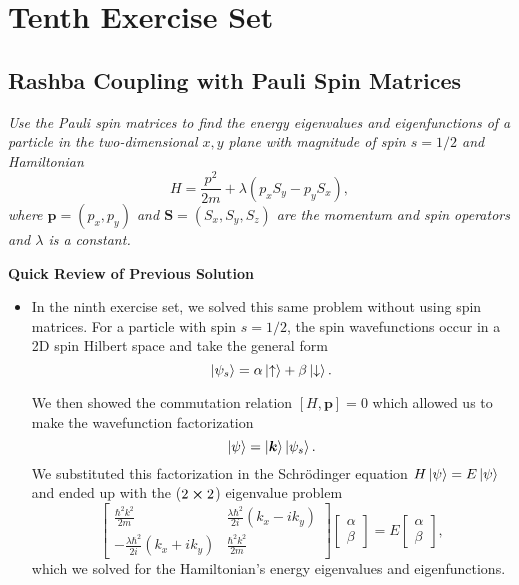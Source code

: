 \documentclass[11pt, a4paper]{article}
\newcommand{\Schro}{Schr\"{o}dinger\xspace}
\renewcommand{\vec}[1]{\bm{#1}} %
\newcommand{\ua}{\uparrow}  %
\newcommand{\da}{\downarrow}  %
\begin{document}
\section{Tenth Exercise Set}

\subsection{Rashba Coupling with Pauli Spin Matrices}
\textit{Use the Pauli spin matrices to find the energy eigenvalues and eigenfunctions of a particle in the two-dimensional $ x, y $ plane with magnitude of spin $ s = 1/2 $ and Hamiltonian}
\begin{equation*}
	H = \frac{p^{2}}{2m} + \lambda (p_{x}S_{y} - p_{y}S_{x}),
\end{equation*}
\textit{where $ \vec{p} = (p_{x}, p_{y}) $ and $ \vec{S} = (S_{x}, S_{y}, S_{z}) $ are the momentum and spin operators and $ \lambda $ is a constant.}


\vspace{2mm}
\textbf{Quick Review of Previous Solution}
\begin{itemize}
	\item In the ninth exercise set, we solved this same problem without using spin matrices. For a particle with spin $ s = 1/2 $, the spin wavefunctions occur in a 2D spin Hilbert space and take the general form
	\begin{equation*}
		\ket{\psi_{s}} = \alpha \ket{\ua} + \beta \ket{\da}.
	\end{equation*}
	
	We then showed the commutation relation $ [H, \vec{p}] = 0 $ which allowed us to make the wavefunction factorization
	\begin{equation*}
		\ket{\psi} = \ket{\vec{k}}\ket{\psi_{s}}.
	\end{equation*}
	We substituted this factorization in the \Schro equation $ H \ket{\psi} = E \ket{\psi} $ and ended up with the ($ 2 \cross 2 $) eigenvalue problem
	\begin{equation*}
		\begin{bmatrix}
		\frac{\hbar^{2}k^{2}}{2m} & \frac{\lambda \hbar^{2}}{2i}(k_{x}-ik_{y}) \\
		-\frac{\lambda \hbar^{2}}{2i}(k_{x}+ik_{y}) & \frac{\hbar^{2}k^{2}}{2m}
		\end{bmatrix}
		\begin{bmatrix}
			\alpha\\
			\beta
		\end{bmatrix}
		= E
		\begin{bmatrix}
			\alpha\\
			\beta
		\end{bmatrix},
	\end{equation*}
	which we solved for the Hamiltonian's energy eigenvalues and eigenfunctions.
\end{itemize}
\end{document}
